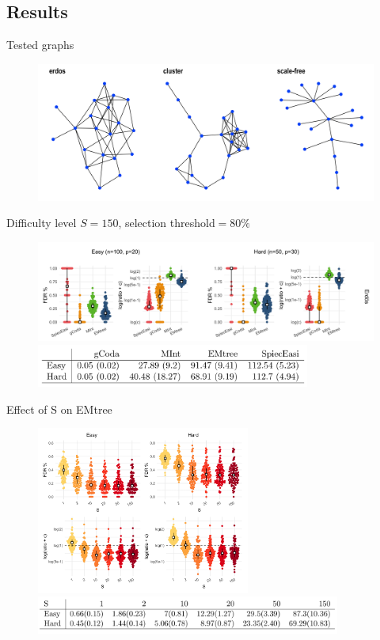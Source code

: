 \documentclass[11pt]{beamer}
\begin{document}
\subsection{Results}
\begin{frame}{Tested graphs}
    \begin{figure}
        \centering
        \includegraphics[width=\linewidth]{graphs}
    \end{figure}
\end{frame}
\begin{frame}{Difficulty level}
\tiny{$S=150$, selection threshold$ = 80\%$}
\begin{figure}
    \centering
       \includegraphics[width=12.5cm]{TPFNErdos.png}\\
       \vspace{1cm}
    \includegraphics[width=9cm]{times_EH.png}
\end{figure}
\end{frame}

\begin{frame}{Effect of S on EMtree}
 \begin{figure}
  \centering
   \includegraphics[width=7cm]{compareS.png}\\
  \includegraphics[width=10cm]{timesS.png}
\end{figure}
\end{frame}
\end{document}
